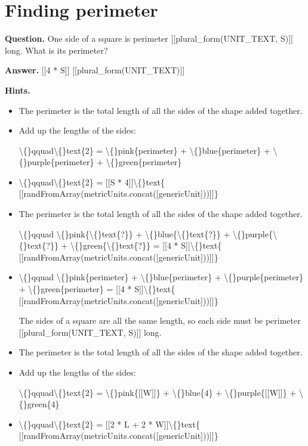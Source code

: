\documentclass{article}
\begin{document}
\section*{Finding perimeter}
\textbf{Question.} One side of a square is perimeter
                [[plural\_form(UNIT\_TEXT, S)]] long. What is its perimeter?

\textbf{Answer.} [[4 * S]]
                [[plural\_form(UNIT\_TEXT)]]

\textbf{Hints.}
\begin{itemize}
  \item The perimeter is the total length of all the sides of the
                    shape added together.
  \item Add up the lengths of the sides:
                    
                    \textbackslash\{\}qquad\textbackslash\{\}text\{2\} =
                        \textbackslash\{\}pink\{perimeter\} + \textbackslash\{\}blue\{perimeter\} +
                        \textbackslash\{\}purple\{perimeter\} + \textbackslash\{\}green\{perimeter\}
  \item \textbackslash\{\}qquad\textbackslash\{\}text\{2\} =
                    [[S * 4]]\textbackslash\{\}text\{ [[randFromArray(metricUnits.concat([genericUnit]))]]\}
  \item The perimeter is the total length of all the sides of
                        the shape added together.
                    
                    \textbackslash\{\}qquad \textbackslash\{\}pink\{\textbackslash\{\}text\{?\}\} + \textbackslash\{\}blue\{\textbackslash\{\}text\{?\}\} +
                        \textbackslash\{\}purple\{\textbackslash\{\}text\{?\}\} + \textbackslash\{\}green\{\textbackslash\{\}text\{?\}\} =
                        [[4 * S]]\textbackslash\{\}text\{ [[randFromArray(metricUnits.concat([genericUnit]))]]\}
  \item \textbackslash\{\}qquad \textbackslash\{\}pink\{perimeter\} + \textbackslash\{\}blue\{perimeter\} +
                        \textbackslash\{\}purple\{perimeter\} + \textbackslash\{\}green\{perimeter\} =
                        [[4 * S]]\textbackslash\{\}text\{ [[randFromArray(metricUnits.concat([genericUnit]))]]\}
                    
                    
                        The sides of a square are all the same length, so each
                        side must be perimeter
                        [[plural\_form(UNIT\_TEXT, S)]] long.
  \item The perimeter is the total length of all the sides of the
                    shape added together.
  \item Add up the lengths of the sides:
                    
                    \textbackslash\{\}qquad\textbackslash\{\}text\{2\} =
                        \textbackslash\{\}pink\{[[W]]\} + \textbackslash\{\}blue\{4\} +
                        \textbackslash\{\}purple\{[[W]]\} + \textbackslash\{\}green\{4\}
  \item \textbackslash\{\}qquad\textbackslash\{\}text\{2\} =
                    [[2 * L + 2 * W]]\textbackslash\{\}text\{ [[randFromArray(metricUnits.concat([genericUnit]))]]\}
\end{itemize}
\end{document}
